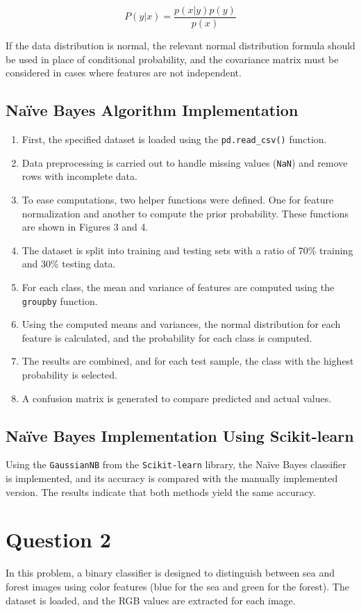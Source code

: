 \documentclass[DIV=calc, paper=a4, fontsize=11pt, twocolumn]{scrartcl}	 %
\begin{document}
\[
P(y | x) = \frac{p(x | y) p(y)}{p(x)}
\]

If the data distribution is normal, the relevant normal distribution formula should be used in place of conditional probability, and the covariance matrix must be considered in cases where features are not independent.

\subsection*{\small{Naïve Bayes Algorithm Implementation}}
\begin{enumerate}
    \item First, the specified dataset is loaded using the \texttt{pd.read\_csv()} function.
    \item Data preprocessing is carried out to handle missing values (\texttt{NaN}) and remove rows with incomplete data.
    \item To ease computations, two helper functions were defined. One for feature normalization and another to compute the prior probability. These functions are shown in Figures 3 and 4.
    \item The dataset is split into training and testing sets with a ratio of 70\% training and 30\% testing data.
    \item For each class, the mean and variance of features are computed using the \texttt{groupby} function.
    \item Using the computed means and variances, the normal distribution for each feature is calculated, and the probability for each class is computed.
    \item The results are combined, and for each test sample, the class with the highest probability is selected.
    \item A confusion matrix is generated to compare predicted and actual values.
\end{enumerate}

\subsection*{\small{Naïve Bayes Implementation Using Scikit-learn}}
Using the \texttt{GaussianNB} from the \texttt{Scikit-learn} library, the Naïve Bayes classifier is implemented, and its accuracy is compared with the manually implemented version. The results indicate that both methods yield the same accuracy.

\section*{\small{Question 2}}
In this problem, a binary classifier is designed to distinguish between sea and forest images using color features (blue for the sea and green for the forest). The dataset is loaded, and the RGB values are extracted for each image.
\end{document}
